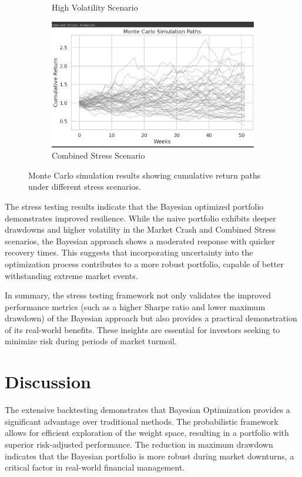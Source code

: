 \documentclass[a4paper,12pt]{article}
\begin{document}
\begin{figure}[H]
\begin{subfigure}[b]{0.45\textwidth}
        \caption{High Volatility Scenario}
        \label{fig:stress_volatility}
    \end{subfigure}
    \hfill
    \begin{subfigure}[b]{0.45\textwidth}
        \centering
        \includegraphics[width=\textwidth]{figures/Figure6d.png}
        \caption{Combined Stress Scenario}
        \label{fig:stress_combined}
    \end{subfigure}
    \caption{Monte Carlo simulation results showing cumulative return paths under different stress scenarios.}
    \label{fig:stress_scenarios}
\end{figure}

The stress testing results indicate that the Bayesian optimized portfolio demonstrates improved resilience. While the naive portfolio exhibits deeper drawdowns and higher volatility in the Market Crash and Combined Stress scenarios, the Bayesian approach shows a moderated response with quicker recovery times. This suggests that incorporating uncertainty into the optimization process contributes to a more robust portfolio, capable of better withstanding extreme market events.

In summary, the stress testing framework not only validates the improved performance metrics (such as a higher Sharpe ratio and lower maximum drawdown) of the Bayesian approach but also provides a practical demonstration of its real-world benefits. These insights are essential for investors seeking to minimize risk during periods of market turmoil.

\section{Discussion}
The extensive backtesting demonstrates that Bayesian Optimization provides a significant advantage over traditional methods. The probabilistic framework allows for efficient exploration of the weight space, resulting in a portfolio with superior risk-adjusted performance. The reduction in maximum drawdown indicates that the Bayesian portfolio is more robust during market downturns, a critical factor in real-world financial management.
\end{document}
